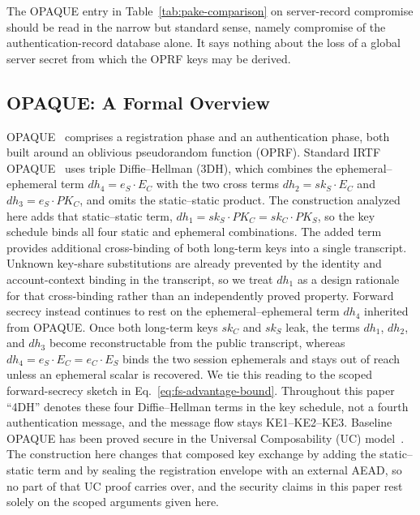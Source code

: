 \documentclass{ieeeijc}
\theoremstyle{remark}
\begin{document}
The OPAQUE entry in Table~\ref{tab:pake-comparison} on server-record
compromise should be read in the narrow but standard sense, namely
compromise of the authentication-record database alone. It says nothing
about the loss of a global server secret from which the OPRF keys may be
derived.

\subsection{OPAQUE: A Formal Overview}

OPAQUE~\cite{jarecki2018} comprises a registration phase and an
authentication phase, both built around an oblivious pseudorandom
function (OPRF). Standard IRTF OPAQUE~\cite{ietf-opaque} uses triple Diffie--Hellman
(3DH), which combines the ephemeral--ephemeral term $dh_4 = e_S \cdot E_C$
with the two cross terms $dh_2 = sk_S \cdot E_C$ and
$dh_3 = e_S \cdot PK_C$, and omits the static--static product.
The construction analyzed here adds that static--static term,
$dh_1 = sk_S \cdot PK_C = sk_C \cdot PK_S$, so the key schedule binds all
four static and ephemeral combinations. The added term provides additional cross-binding of both long-term keys into a
single transcript. Unknown key-share substitutions are already prevented by the
identity and account-context binding in the transcript, so we treat $dh_1$ as a
design rationale for that cross-binding rather than an independently proved
property. Forward secrecy instead continues to rest on the
ephemeral--ephemeral term $dh_4$ inherited from OPAQUE. Once both long-term
keys $sk_C$ and $sk_S$ leak, the terms $dh_1$, $dh_2$, and $dh_3$ become
reconstructable from the public transcript, whereas
$dh_4 = e_S \cdot E_C = e_C \cdot E_S$ binds the two session ephemerals and
stays out of reach unless an ephemeral scalar is recovered. We tie this
reading to the scoped forward-secrecy sketch in
Eq.~\eqref{eq:fs-advantage-bound}. Throughout this paper
``4DH'' denotes these four Diffie--Hellman terms in the key schedule,
not a fourth authentication message, and the message flow stays
KE1--KE2--KE3.
Baseline OPAQUE has been proved secure in the Universal Composability
(UC) model~\cite{jarecki2018,canetti2001}. The construction here changes that
composed key exchange by adding the static--static term and by sealing the
registration envelope with an external AEAD, so no part of that UC proof carries
over, and the security claims in this paper rest solely on the scoped arguments
given here.
\end{document}
